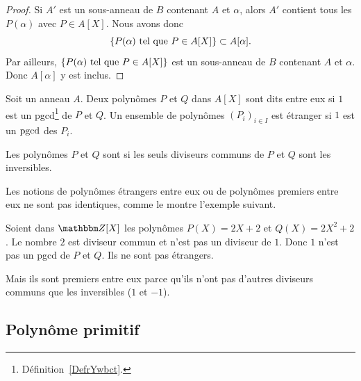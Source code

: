 \begin{proof}
    Si \( A'\) est un sous-anneau de \( B\) contenant \( A\) et \( \alpha\), alors \( A'\) contient tous les \( P(\alpha)\) avec \( P\in A[X]\). Nous avons donc
    \begin{equation}
        \{ P(\alpha)\text{ tel que } P\in A[X] \}\subset A[\alpha].
    \end{equation}
    Par ailleurs, \( \{ P(\alpha)\text{ tel que } P\in A[X] \}\) est un sous-anneau de \( B\) contenant \( A\) et \( \alpha\). Donc \( A[\alpha]\) y est inclus.
\end{proof}

\begin{definition}  \label{DefDSFooZVbNAX}
    Soit un anneau \( A\). Deux polynômes \( P\) et \( Q\) dans \( A[X]\) sont dits  entre eux si \( 1\) est un pgcd\footnote{Définition~\ref{DefrYwbct}.} de \( P\) et \( Q\). Un ensemble de polynômes \( (P_i)_{i\in I}\) est étranger  si \( 1\) est un \( \operatorname{pgcd}\) des \( P_i\).

Les polynômes \( P\) et \( Q\) sont  si les seuls diviseurs communs de \( P\) et \( Q\) sont les inversibles.
\end{definition}

Les notions de polynômes étrangers entre eux ou de polynômes premiers entre eux ne sont pas identiques, comme le montre l'exemple suivant.

\begin{example}
    Soient dans \( \eZ[X]\) les polynômes \( P(X)=2X+2\) et \( Q(X)=2X^2+2\). Le nombre \( 2\) est diviseur commun et n'est pas un diviseur de \( 1\). Donc \( 1\) n'est pas un pgcd de \( P\) et \( Q\). Ils ne sont pas étrangers.

    Mais ils sont premiers entre eux parce qu'ils n'ont pas d'autres diviseurs communs que les inversibles (\( 1\) et \( -1\)).
\end{example}

\subsection{Polynôme primitif}

